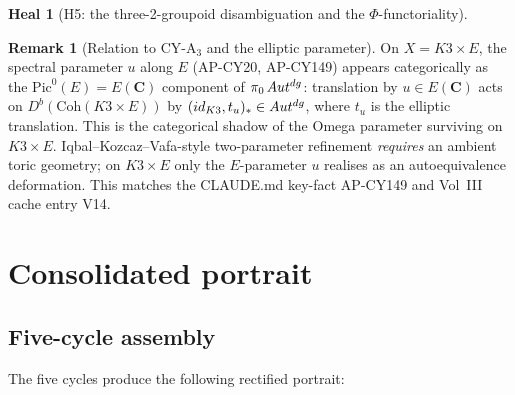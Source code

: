 \documentclass[11pt]{amsart}
\theoremstyle{definition}
\newtheorem{heal}[attack]{Heal}
\newtheorem{remark}{Remark}
\providecommand{\Coh}{\mathrm{Coh}}
\providecommand{\Autdg}{\mathrm{Aut}^{\rm dg}}
\providecommand{\Pic}{\mathrm{Pic}}
\providecommand{\bC}{\mathbf{C}}
\begin{document}
\begin{heal}[H5: the three-2-groupoid disambiguation and the
$\Phi$-functoriality]
\begin{remark}[Relation to CY-A$_3$ and the elliptic parameter]
On $X = K3 \times E$, the spectral parameter $u$ along $E$
(AP-CY20, AP-CY149) appears categorically as the
$\Pic^0(E) = E(\bC)$ component of $\pi_0\,\Autdg$: translation by
$u \in E(\bC)$ acts on $D^b(\Coh(K3 \times E))$ by
$(\mathrm{id}_{K3}, t_u)_* \in \Autdg$, where $t_u$ is the elliptic
translation. This is the categorical shadow of the Omega parameter
surviving on $K3 \times E$. Iqbal--Kozcaz--Vafa-style two-parameter
refinement \emph{requires} an ambient toric geometry; on $K3 \times E$
only the $E$-parameter $u$ realises as an autoequivalence deformation.
This matches the CLAUDE.md key-fact AP-CY149 and Vol~III cache entry
V14.
\end{remark}
\end{heal}

\section{Consolidated portrait}
\label{sec:portrait}

\subsection{Five-cycle assembly}

The five cycles produce the following rectified portrait:
\end{document}
